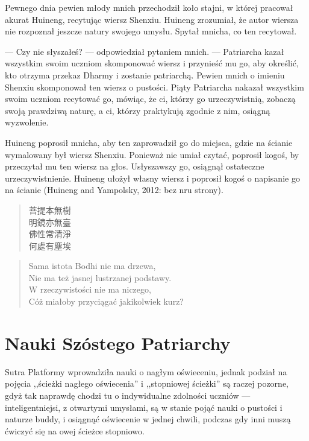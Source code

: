 Pewnego dnia pewien młody mnich przechodził koło stajni, w której pracował akurat Huineng, recytując wiersz Shenxiu. Huineng zrozumiał, że autor wiersza nie rozpoznał jeszcze natury swojego umysłu. Spytał mnicha, co ten recytował.

--- Czy nie słyszałeś? --- odpowiedział pytaniem mnich. --- Patriarcha kazał wszystkim swoim uczniom skomponować wiersz i przynieść mu go, aby określić, kto otrzyma przekaz Dharmy i zostanie patriarchą. Pewien mnich o imieniu Shenxiu skomponował ten wiersz o pustości. Piąty Patriarcha nakazał wszystkim swoim uczniom recytować go, mówiąc, że ci, którzy go urzeczywistnią, zobaczą swoją prawdziwą naturę, a ci, którzy praktykują zgodnie z nim, osiągną wyzwolenie.

Huineng poprosił mnicha, aby ten zaprowadził go do miejsca, gdzie na ścianie wymalowany był wiersz Shenxiu. Ponieważ nie umiał czytać, poprosił kogoś, by przeczytał mu ten wiersz na głos. Usłyszawszy go, osiągnął ostateczne urzeczywistnienie. Huineng ułożył własny wiersz i poprosił kogoś o napisanie go na ścianie (Huineng and Yampolsky, 2012: bez nru strony).

\begin{minipage}[t]{0.4\textwidth}
\begin{verse}
菩提本無樹\\
明鏡亦無臺\\
佛性常清淨\\
何處有塵埃
\end{verse}
\end{minipage}
\begin{minipage}[t]{0.6\textwidth}
\itshape
\begin{verse}
Sama istota Bodhi nie ma drzewa,\\
Nie ma też jasnej lustrzanej podstawy.\\
W rzeczywistości nie ma niczego,\\
Cóż miałoby przyciągać jakikolwiek kurz?
\end{verse}
\end{minipage}

\section{Nauki Szóstego Patriarchy}

Sutra Platformy wprowadziła nauki o nagłym oświeceniu, jednak podział na pojęcia ,,ścieżki nagłego oświecenia'' i ,,stopniowej ścieżki'' są raczej pozorne, gdyż tak naprawdę chodzi tu o indywidualne zdolności uczniów --- inteligentniejsi, z otwartymi umysłami, są w stanie pojąć nauki o pustości i naturze buddy, i osiągnąć oświecenie w jednej chwili, podczas gdy inni muszą ćwiczyć się na owej ścieżce stopniowo.

